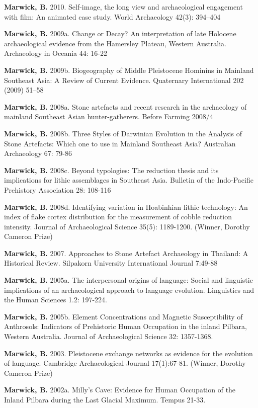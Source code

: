 \documentclass[11pt,article,oneside]{memoir}
\begin{document}
\ind \textbf{Marwick, B.} 2010. Self-image, the long view and archaeological engagement with film: An animated case study. World Archaeology 42(3): 394–404

\ind \textbf{Marwick, B.} 2009a. Change or Decay? An interpretation of late Holocene archaeological evidence from the Hamersley Plateau, Western Australia. Archaeology in Oceania 44: 16-22

\ind \textbf{Marwick, B.}  2009b. Biogeography of Middle Pleistocene Hominins in Mainland Southeast Asia: A Review of Current Evidence. Quaternary International 202 (2009) 51–58

\ind \textbf{Marwick, B.} 2008a. Stone artefacts and recent research in the archaeology of mainland Southeast Asian hunter-gatherers. Before Farming 2008/4

\ind \textbf{Marwick, B.} 2008b. Three Styles of Darwinian Evolution in the Analysis of Stone Artefacts: Which one to use in Mainland Southeast Asia? Australian Archaeology 67: 79-86

\ind \textbf{Marwick, B.} 2008c. Beyond typologies: The reduction thesis and its implications for lithic assemblages in Southeast Asia. Bulletin of the Indo-Pacific Prehistory Association 28: 108-116

\ind \textbf{Marwick, B.} 2008d. Identifying variation in Hoabinhian lithic technology: An index of flake cortex distribution for the measurement of cobble reduction intensity. Journal of Archaeological Science 35(5): 1189-1200. (Winner, Dorothy Cameron Prize)

\ind \textbf{Marwick, B.} 2007. Approaches to Stone Artefact Archaeology in Thailand: A Historical Review. Silpakorn University International Journal 7:49-88

\ind \textbf{Marwick, B.} 2005a. The interpersonal origins of language: Social and linguistic implications of an archaeological approach to language evolution. Linguistics and the Human Sciences 1.2: 197-224.

\ind \textbf{Marwick, B.} 2005b. Element Concentrations and Magnetic Susceptibility of Anthrosols: Indicators of Prehistoric Human Occupation in the inland Pilbara, Western Australia. Journal of Archaeological Science 32: 1357-1368.

\ind \textbf{Marwick, B.} 2003. Pleistocene exchange networks as evidence for the evolution of language. Cambridge Archaeological Journal 17(1):67-81. (Winner, Dorothy Cameron Prize)

\ind \textbf{Marwick, B.} 2002a. Milly’s Cave: Evidence for Human Occupation of the Inland Pilbara during the Last Glacial Maximum. Tempus 21-33.
\end{document}
